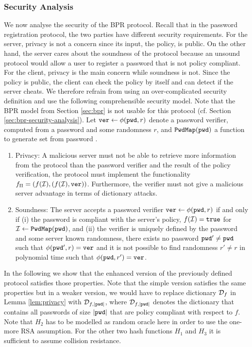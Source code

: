 \subsubsection{Security Analysis} \label{sec:bpr:security}
We now analyse the security of the \ac{BPR} protocol. 
Recall that in the password registration protocol, the two parties have different security requirements. For the server, privacy is not a concern since its input, the policy, is public. 
On the other hand, the server cares about the soundness of the protocol because an unsound protocol would allow a user to register a password that is not policy compliant. 
For the client, privacy is the main concern while soundness is not. Since the policy is public, the client can check the policy by itself and can detect if the server cheats. 
We therefore refrain from using an over-complicated security definition and use the following comprehensible security model.
Note that the \ac{BPR} model from Section \ref{sec:bpr} is not usable for this protocol (cf. Section \ref{sec:bpr-security-analysis}).
Let $\mathtt{ver}\gets\phi(\mathtt{pwd},r)$ denote a password verifier, computed from a password \pwd and some randomness $r$, and $\mathtt{PwdMap}(\mathtt{pwd})$ a function to generate set \ClientSet from password \pwd.
\begin{enumerate}
  \item Privacy: A malicious server must not be able to retrieve more information from the protocol than the password verifier and the result of the policy verification, \ie the protocol must implement the functionality $f_{\Pi}=(f(\mathcal{I}), (f(\mathcal{I}), \mathtt{ver}))$. Furthermore, the verifier must not give a malicious server advantage in terms of dictionary attacks. 
  
  \item Soundness: The server accepts a password verifier $\mathtt{ver}\gets\phi(\mathtt{pwd},r)$ if and only if (i) the password is compliant with the server's policy, \ie $f(\mathcal{I})=\mathtt{true}$ for $\mathcal{I}\gets\mathtt{PwdMap}(\mathtt{pwd})$, and (ii) the verifier is uniquely defined by the password and some server known randomness, \ie there exists no password $\mathtt{pwd}'\not=\mathtt{pwd}$ such that $\phi(\mathtt{pwd}',r)=\mathtt{ver}$ and it is not possible to find randomness $r'\not=r$ in polynomial time such that $\phi(\mathtt{pwd},r')=\mathtt{ver}$.
\end{enumerate}

\noindent
In the following we show that the enhanced version of the previously defined protocol satisfies those properties.
Note that the simple version satisfies the same properties but in a weaker version, \ie we would have to replace dictionary $\mathcal{D}_f$ in Lemma \ref{lem:privacy} with $\mathcal{D}_{f,|\mathtt{pwd}|}$, where $\mathcal{D}_{f,|\mathtt{pwd}|}$ denotes the dictionary that contains all passwords of size $|\mathtt{pwd}|$ that are policy compliant with respect to $f$.
Note that $H_2$ has to be modelled as random oracle here in order to use the one-more RSA assumption.
For the other two hash functions $H_1$ and $H_3$ it is sufficient to assume collision resistance.


